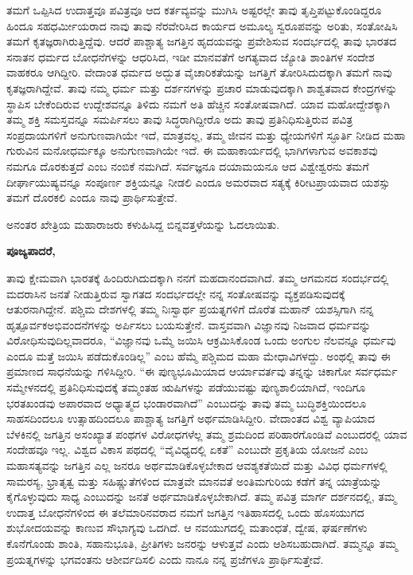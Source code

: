 \vskip 0.2cm

ತಮಗೆ ಒಪ್ಪಿಸಿದ ಉದಾತ್ತವೂ ಪವಿತ್ರವೂ ಆದ ಕರ್ತವ್ಯವನ್ನು ಮುಗಿಸಿ ಅಷ್ಟರಲ್ಲೇ ತಾವು ತೃಪ್ತಿಪಟ್ಟುಕೊಂಡಿದ್ದರೂ ಹಿಂದೂ ಸಹಧರ್ಮೀಯರಾದ ನಾವು ತಾವು ನೆರವೇರಿಸಿದ ಕಾರ್ಯದ ಅಮೂಲ್ಯ ಸ್ವರೂಪವನ್ನು ಅರಿತು, ಸಂತೋಷಿಸಿ ತಮಗೆ ಕೃತಜ್ಞರಾಗಿರುತ್ತಿದ್ದೆವು. ಆದರೆ ಪಾಶ್ಚಾತ್ಯ ಜಗತ್ತಿನ ಹೃದಯವನ್ನು ಪ್ರವೇಶಿಸುವ ಸಂದರ್ಭದಲ್ಲಿ ತಾವು ಭಾರತದ ಸನಾತನ ಧರ್ಮದ ಬೋಧನೆಗಳನ್ನು ಆಧರಿಸಿದ, ಇಡೀ ಮಾನವತೆಗೆ ಅಗತ್ಯವಾದ ಜ್ಯೋತಿ ಶಾಂತಿಗಳ ಸಂದೇಶ ವಾಹಕರೂ ಆಗಿದ್ದೀರಿ. ವೇದಾಂತ ಧರ್ಮದ ಅದ್ಭುತ ವೈಚಾರಿಕತೆಯನ್ನು ಜಗತ್ತಿಗೆ ತೋರಿಸಿದುದಕ್ಕಾಗಿ ತಮಗೆ ನಾವು ಕೃತಜ್ಞರಾಗಿದ್ದೇವೆ. ತಾವು ನಮ್ಮ ಧರ್ಮ ಮತ್ತು ದರ್ಶನಗಳನ್ನು ಪ್ರಚಾರ ಮಾಡುವುದಕ್ಕಾಗಿ ಶಾಶ್ವತವಾದ ಕೇಂದ್ರಗಳನ್ನು ಸ್ಥಾಪಿಸ ಬೇಕೆಂದಿರುವ ಉದ್ದೇಶವನ್ನೂ ತಿಳಿದು ನಮಗೆ ಅತಿ ಹೆಚ್ಚಿನ ಸಂತೋಷವಾಗಿದೆ. ಯಾವ ಮಹೋದ್ದೇಶಕ್ಕಾಗಿ ತಮ್ಮ ಶಕ್ತಿ ಸಮಸ್ತವನ್ನೂ ಸಮರ್ಪಿಸಲು ತಾವು ಸಿದ್ಧರಾಗಿದ್ದೀರೊ ಅದು ತಾವು ಪ್ರತಿನಿಧಿಸುತ್ತಿರುವ ಪವಿತ್ರ ಸಂಪ್ರದಾಯಗಳಿಗೆ ಅನುಗುಣವಾಗಿಯೇ ಇದೆ, ಮಾತ್ರವಲ್ಲ, ತಮ್ಮ ಜೀವನ ಮತ್ತು ಧ್ಯೇಯಗಳಿಗೆ ಸ್ಫೂರ್ತಿ ನೀಡಿದ ಮಹಾ ಗುರುವಿನ ಮನೋಧರ್ಮಕ್ಕೂ ಅನುಗುಣವಾಗಿಯೇ ಇದೆ. ಈ ಮಹಾಕಾರ್ಯದಲ್ಲಿ ಭಾಗಿಗಳಾಗುವ ಅವಕಾಶವು ನಮಗೂ ದೊರಕುತ್ತದೆ ಎಂಬ ನಂಬಿಕೆ ನಮಗಿದೆ. ಸರ್ವಜ್ಞನೂ ದಯಾಮಯನೂ ಆದ ವಿಶ್ವೇಶ್ವರನು ತಮಗೆ ದೀರ್ಘಾಯುಷ್ಯವನ್ನೂ ಸಂಪೂರ್ಣ ಶಕ್ತಿಯನ್ನೂ ನೀಡಲಿ ಎಂದೂ ಅಮರವಾದ ಸತ್ಯಕ್ಕೆ ಕಿರೀಟಪ್ರಾಯವಾದ ಯಶಸ್ಸು ತಮಗೆ ದೊರಕಲಿ ಎಂದೂ ನಾವು ಪ್ರಾರ್ಥಿಸುತ್ತೇವೆ.

\vskip 0.2cm

ಅನಂತರ ಖೇತ್ರಿಯ ಮಹಾರಾಜರು ಕಳುಹಿಸಿದ್ದ ಬಿನ್ನವತ್ತಳೆಯನ್ನು ಓದಲಾಯಿತು.

\vskip 0.2cm

\textbf{ಪೂಜ್ಯಪಾದರೆ,}

\vskip 0.2cm

ತಾವು ಕ್ಷೇಮವಾಗಿ ಭಾರತಕ್ಕೆ ಹಿಂದಿರುಗಿದುದಕ್ಕಾಗಿ ನನಗೆ ಮಹದಾನಂದವಾಗಿದೆ. ತಮ್ಮ ಆಗಮನದ ಸಂದರ್ಭದಲ್ಲಿ ಮದರಾಸಿನ ಜನತೆ ನೀಡುತ್ತಿರುವ ಸ್ವಾಗತದ ಸಂದರ್ಭದಲ್ಲೇ ನನ್ನ ಸಂತೋಷವನ್ನು ವ್ಯಕ್ತಪಡಿಸುವುದಕ್ಕೆ ಆತುರನಾಗಿದ್ದೇನೆ. ಪಶ್ಚಿಮ ದೇಶಗಳಲ್ಲಿ ತಮ್ಮ ನಿಃಸ್ವಾರ್ಥ ಪ್ರಯತ್ನಗಳಿಗೆ ದೊರೆತ ಮಹಾನ್​ ಯಶಸ್ಸಿಗಾಗಿ ನನ್ನ ಹೃತ್ಪೂರ್ವಕ\break ಅಭಿವಂದನೆಗಳನ್ನು ಅರ್ಪಿಸಲು ಬಯಸುತ್ತೇನೆ. ವಾಸ್ತವವಾಗಿ ವಿಜ್ಞಾನವು ನಿಜವಾದ ಧರ್ಮವನ್ನು ವಿರೋಧಿಸುವುದಿಲ್ಲವಾದರೂ, “ವಿಜ್ಞಾನವು ಒಮ್ಮೆ ಜಯಿಸಿ ಆಕ್ರಮಿಸಿಕೊಂಡ ಒಂದು ಅಂಗುಲ ನೆಲವನ್ನೂ ಧರ್ಮವು ಎಂದೂ ಮತ್ತೆ ಜಯಿಸಿ ಪಡೆದುಕೊಂಡಿಲ್ಲ” ಎಂಬ ಹೆಮ್ಮೆ ಪಶ್ಚಿಮದ ಮಹಾ ಮೇಧಾವಿಗಳದ್ದು. ಅಂಥಲ್ಲಿ ತಾವು ಈ ಪ್ರಮಾಣದ ಸಾಧನೆಯನ್ನು ಗಳಿಸಿದ್ದೀರಿ. “ಈ ಪುಣ್ಯಭೂಮಿಯಾದ ಆರ್ಯಾವರ್ತವು ತನ್ನನ್ನು ಚಿಕಾಗೋ ಸರ್ವಧರ್ಮ ಸಮ್ಮೇಳನದಲ್ಲಿ ಪ್ರತಿನಿಧಿಸುವುದಕ್ಕೆ ತಮ್ಮಂತಹ ಋಷಿಗಳನ್ನು ಪಡೆಯುವಷ್ಟು ಪುಣ್ಯಶಾಲಿಯಾಗಿದೆ, ಇಂದಿಗೂ ಭರತಖಂಡವು ಅಪಾರವಾದ ಅಧ್ಯಾತ್ಮದ ಭಂಡಾರವಾಗಿದೆ” ಎಂಬುದನ್ನು ತಾವು ತಮ್ಮ ಬುದ್ಧಿಶಕ್ತಿಯಿಂದಲೂ ಸಾಹಸದಿಂದಲೂ ಉತ್ಸಾಹದಿಂದಲೂ ಪಾಶ್ಚಾತ್ಯ ಜಗತ್ತಿಗೆ ಅರ್ಥಮಾಡಿಸಿದ್ದೀರಿ. ವೇದಾಂತದ ವಿಶ್ವ ವ್ಯಾಪಿಯಾದ ಬೆಳಕಿನಲ್ಲಿ ಜಗತ್ತಿನ ಅಸಂಖ್ಯಾತ ಪಂಥಗಳ ವಿರೋಧಗಳೆಲ್ಲ ತಮ್ಮ ಶ್ರಮದಿಂದ ಪರಿಹಾರಗೊಂಡಿವೆ ಎಂಬುದರಲ್ಲಿ ಯಾವ ಸಂದೇಹವೂ ಇಲ್ಲ. ವಿಶ್ವದ ವಿಕಾಸ ಪಥದಲ್ಲಿ “ವೈವಿಧ್ಯದಲ್ಲಿ ಏಕತೆ” ಎಂಬುದೇ ಪ್ರಕೃತಿಯ ಯೋಜನೆ ಎಂಬ ಮಹಾಸತ್ಯವನ್ನು ಜಗತ್ತಿನ ಎಲ್ಲ ಜನರೂ ಅರ್ಥಮಾಡಿಕೊಳ್ಳಬೇಕಾದ ಆವಶ್ಯಕತೆಯಿದೆ ಮತ್ತು ವಿವಿಧ ಧರ್ಮಗಳಲ್ಲಿ ಸಾಮರಸ್ಯ, ಭ್ರಾತೃತ್ವ ಮತ್ತು ಸಹಿಷ್ಣುತೆಗಳಿಂದ ಮಾತ್ರವೇ ಮಾನವತೆ ಅಂತಿಮಗುರಿಯ ಕಡೆಗೆ ತನ್ನ ಯಾತ್ರೆಯನ್ನು ಕೈಗೊಳ್ಳುವುದು ಸಾಧ್ಯ ಎಂಬುದನ್ನು ಜನತೆ ಅರ್ಥಮಾಡಿಕೊಳ್ಳಬೇಕಾಗಿದೆ. ತಮ್ಮ ಪವಿತ್ರ ಮಾರ್ಗ ದರ್ಶನದಲ್ಲಿ, ತಮ್ಮ ಉದಾತ್ತ ಬೋಧನೆಗಳಿಂದ ಈ ತಲೆಮಾರಿನವರಾದ ನಮಗೆ ಜಗತ್ತಿನ ಇತಿಹಾಸದಲ್ಲಿ ಒಂದು ಹೊಸಯುಗದ ಶುಭೋದಯವನ್ನು ಕಾಣುವ ಸೌಭಾಗ್ಯವು ಒದಗಿದೆ. ಆ ನವಯುಗದಲ್ಲಿ ಮತಾಂಧತೆ, ದ್ವೇಷ, ಘರ್ಷಣೆಗಳು ಕೊನೆಗೊಂಡು ಶಾಂತಿ, ಸಹಾನುಭೂತಿ, ಪ್ರೀತಿಗಳು ಜನರನ್ನು ಆಳುತ್ತವೆ ಎಂದು ಆಶಿಸಬಹುದಾಗಿದೆ. ತಮ್ಮನ್ನೂ ತಮ್ಮ ಪ್ರಯತ್ನಗಳನ್ನು ಭಗವಂತನು ಆಶೀರ್ವದಿಸಲಿ ಎಂದು ನಾನೂ ನನ್ನ ಪ್ರಜೆಗಳೂ ಪ್ರಾರ್ಥಿಸುತ್ತೇವೆ.


